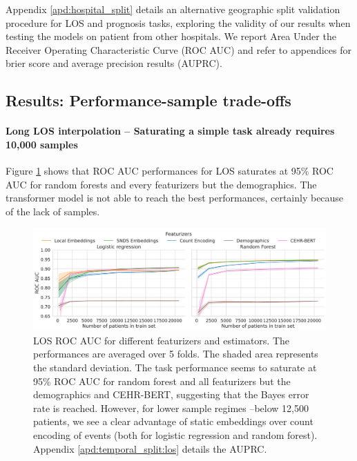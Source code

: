 \documentclass[french,12pt,twoside,a4paper]{book}
\begin{document}
Appendix \ref{apd:hospital_split} details an alternative geographic split
validation procedure for LOS and prognosis tasks, exploring the validity of our
results when testing the models on patient from other hospitals. We report Area
Under the Receiver Operating Characteristic Curve (ROC AUC) and refer to
appendices for brier score and average precision results (AUPRC).


\subsection{Results: Performance-sample
  trade-offs}\label{subsec:predictive_models:results}


\paragraph{Long LOS interpolation -- Saturating a simple task already requires
  10,000 samples}%


Figure \ref{fig:los_roc_auc} shows that ROC AUC performances for LOS saturates
at 95\% ROC AUC for random forests and every featurizers but the demographics.
The transformer model is not able to reach the best performances, certainly
because of the lack of samples.

\begin{figure}[!h]
  \centering
  \includegraphics[width=\linewidth]{img/chapter_3/los/roc_auc_score_performances.pdf}
  \caption{LOS ROC AUC for different featurizers and estimators. The
    performances are averaged over 5 folds. The shaded area represents the
    standard deviation. The task performance seems to saturate at 95\% ROC AUC
    for random forest and all featurizers but the demographics and CEHR-BERT,
    suggesting that the Bayes error rate is reached. However, for lower sample
    regimes --below 12,500 patients, we see a clear advantage of static
    embeddings over count encoding of events (both for logistic regression and
    random forest). Appendix \ref{apd:temporal_split:los} details the AUPRC.}%
  \label{fig:los_roc_auc}
\end{figure}
\end{document}
